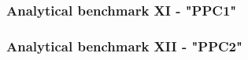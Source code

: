 \subsubsection{Analytical benchmark XI \label{mms11} - "PPC1"}



\subsubsection{Analytical benchmark XII \label{mms11} - "PPC2"}





